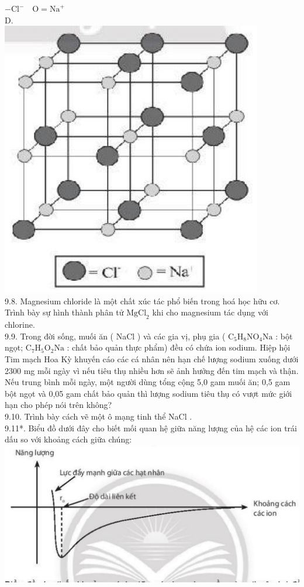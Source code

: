 \documentclass[10pt]{article}
\begin{document}
$-\mathrm{Cl}^{-} \quad \mathrm{O}=\mathrm{Na}^{+}$\\
D.\\
\includegraphics[max width=\textwidth, center]{2025_10_23_883c4b146e2332109fcdg-26(5)}\\
9.8. Magnesium chloride là một chất xúc tác phổ biến trong hoá học hữu cơ. Trình bày sự hình thành phân tử $\mathrm{MgCl}_{2}$ khi cho magnesium tác dụng với chlorine.\\
9.9. Trong đời sống, muối ăn ( NaCl ) và các gia vị, phụ gia ( $\mathrm{C}_{5} \mathrm{H}_{8} \mathrm{NO}_{4} \mathrm{Na}$ : bột ngọt; $\mathrm{C}_{7} \mathrm{H}_{5} \mathrm{O}_{2} \mathrm{Na}$ : chất bảo quản thực phẩm) đều có chứa ion sodium. Hiệp hội Tim mạch Hoa Kỳ khuyến cáo các cá nhân nên hạn chế lượng sodium xuống dưới 2300 mg mỗi ngày vì nếu tiêu thụ nhiều hơn sẽ ảnh hưởng đến tim mạch và thận. Nếu trung bình mỗi ngày, một người dùng tổng cộng 5,0 gam muối ăn; 0,5 gam bột ngọt và 0,05 gam chất bảo quản thì lượng sodium tiêu thụ có vượt mức giới hạn cho phép nói trên không?\\
9.10. Trình bày cách vẽ một ô mạng tinh thể NaCl .\\
9.11*. Biểu đồ dưới đây cho biết mối quan hệ giữa năng lượng của hệ các ion trái dấu so với khoảng cách giữa chúng:\\
\includegraphics[max width=\textwidth, center]{2025_10_23_883c4b146e2332109fcdg-27}
\end{document}
